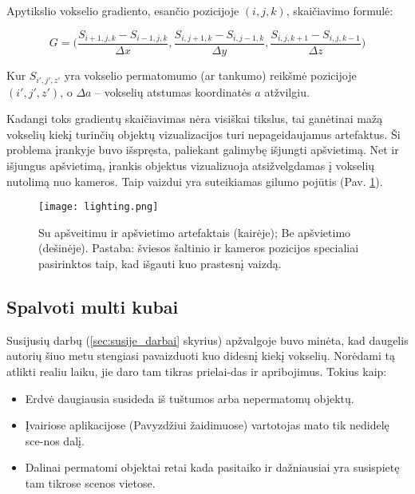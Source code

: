 Apytikslio vokselio gradiento, esančio pozicijoje $(i, j, k)$, skaičiavimo
formulė:

$$
G =\Big( \frac{S_{i+1, j, k} - S_{i-1, j, k}}{\Delta x} ,
         \frac{S_{i, j+1, k} - S_{i, j-1, k}}{\Delta y} ,
         \frac{S_{i, j, k+1} - S_{i, j, k-1}}{\Delta z})
$$

Kur $S_{i', j', z'}$ yra vokselio permatomumo (ar tankumo) reikšmė pozicijoje
$(i', j', z')$, o $\Delta a$ -- vokselių atstumas koordinatės $a$ atžvilgiu.

Kadangi toks gradientų skaičiavimas nėra visiškai tikslus, tai ganėtinai mažą
vokselių kiekį turinčių objektų vizualizacijos turi nepageidaujamus
artefaktus. Ši problema įrankyje buvo išspręsta, paliekant galimybę išjungti
apšvietimą. Net ir išjungus apšvietimą, įrankis objektus vizualizuoja
atsižvelgdamas į vokselių nutolimą nuo kameros. Taip vaizdui yra suteikiamas
gilumo pojūtis (Pav. \ref{fig:lighting}).

\begin{figure}
\centering
\texttt{[image: lighting.png]}
\caption{Su apšveitimu ir apšvietimo artefaktais (kairėje); Be apšvietimo
(dešinėje). Pastaba: šviesos šaltinio ir kameros pozicijos specialiai
pasirinktos taip, kad išgauti kuo prastesnį vaizdą.}
\label{fig:lighting}
\end{figure}

\subsection{Spalvoti multi kubai}

Susijusių darbų (\ref{sec:susije_darbai} skyrius) apžvalgoje buvo minėta, kad
daugelis autorių šiuo metu stengiasi pavaizduoti kuo didesnį kiekį vokselių.
Norėdami tą atlikti realiu laiku, jie daro tam tikras prielai-das ir
apribojimus. Tokius kaip:

\begin{itemize}

\item
  Erdvė daugiausia susideda iš tuštumos arba nepermatomų objektų.

\item
  Įvairiose aplikacijose (Pavyzdžiui žaidimuose) vartotojas mato tik nedidelę
  sce-nos dalį.

\item
  Dalinai permatomi objektai retai kada pasitaiko ir dažniausiai yra
  susispietę tam tikrose scenos vietose.

\end{itemize}

